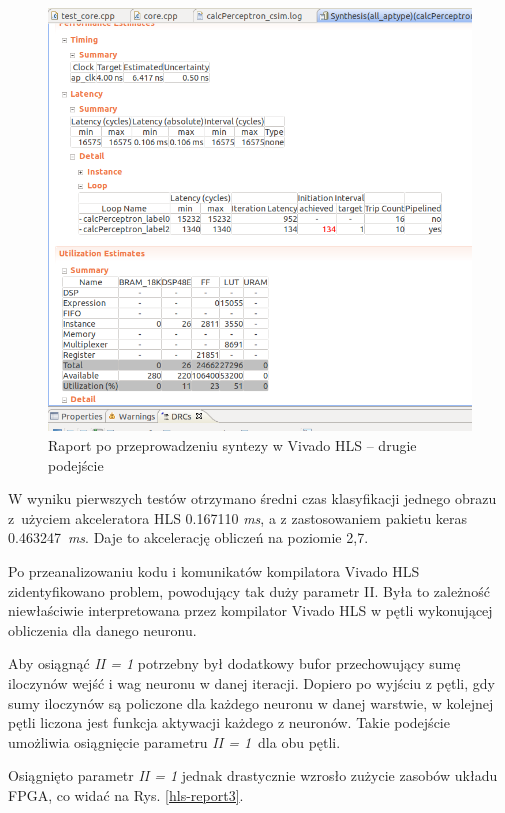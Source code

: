 \begin{figure}[!h]
  \centering
  \includegraphics[width=\textwidth]{img/hls-report2.png}
  \caption{Raport po przeprowadzeniu syntezy w Vivado HLS -- drugie podejście}
  \label{hls-report2}
\end{figure}

W wyniku pierwszych testów otrzymano średni czas klasyfikacji jednego obrazu z~użyciem akceleratora HLS 
0.167110 \emph{ms}, a z zastosowaniem pakietu keras 0.463247~\emph{ms}. Daje to akcelerację obliczeń na 
poziomie 2,7.

Po przeanalizowaniu kodu i komunikatów kompilatora Vivado HLS zidentyfikowano problem, powodujący tak duży parametr II. Była to zależność niewłaściwie interpretowana przez kompilator Vivado HLS w pętli wykonującej obliczenia dla danego neuronu.

Aby osiągnąć \emph{II = 1} potrzebny był dodatkowy bufor przechowujący sumę iloczynów wejść i wag neuronu w danej iteracji. Dopiero po wyjściu z pętli, gdy sumy iloczynów są policzone dla każdego neuronu w danej warstwie, w kolejnej pętli liczona jest funkcja aktywacji każdego z neuronów. Takie podejście umożliwia osiągnięcie parametru \emph{II = 1}~dla obu pętli.

Osiągnięto parametr \emph{II = 1} jednak drastycznie wzrosło zużycie zasobów układu FPGA, co widać na Rys. \ref{hls-report3}.


